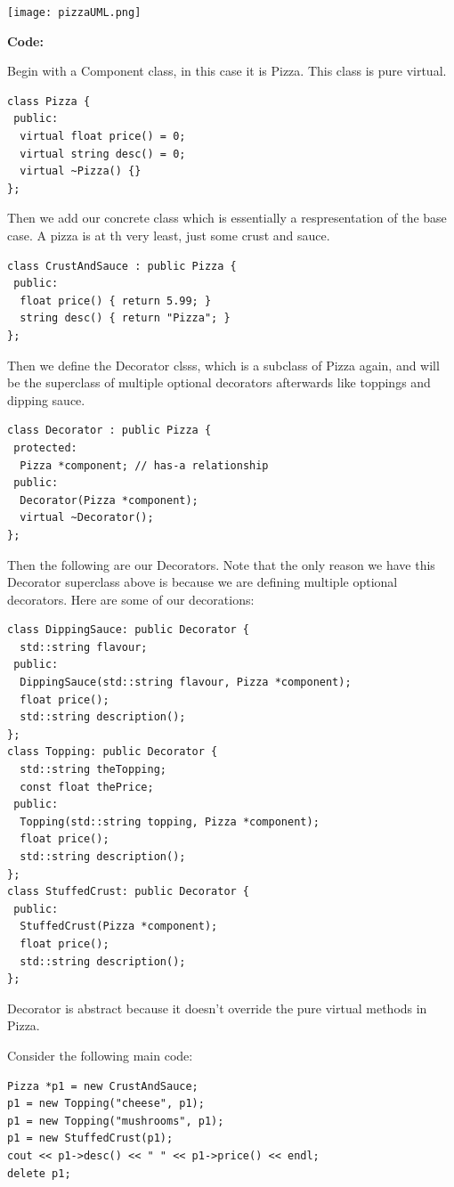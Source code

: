 \documentclass[english, 11pt]{article}
\begin{document}
\begin{exmp}
  \texttt{[image: pizzaUML.png]}

  \textbf{Code:}

Begin with a Component class, in this case it is Pizza. This class is pure virtual.
  \begin{lstlisting}
class Pizza {
 public:
  virtual float price() = 0;
  virtual string desc() = 0;
  virtual ~Pizza() {}
};
\end{lstlisting}
Then we add our concrete class which is essentially a respresentation of the base case. A pizza is at th very least, just some crust and sauce.
\begin{lstlisting}
class CrustAndSauce : public Pizza {
 public:
  float price() { return 5.99; }
  string desc() { return "Pizza"; }
};
\end{lstlisting}
Then we define the Decorator clsss, which is a subclass of Pizza again, and will be the superclass of multiple optional decorators afterwards like toppings and dipping sauce.
\begin{lstlisting}
class Decorator : public Pizza {
 protected:
  Pizza *component; // has-a relationship
 public:
  Decorator(Pizza *component);
  virtual ~Decorator();
};
\end{lstlisting}
Then the following are our Decorators. Note that the only reason we have this Decorator superclass above is because we are defining multiple optional decorators. Here are some of our decorations:
\begin{lstlisting}
class DippingSauce: public Decorator {
  std::string flavour;
 public:
  DippingSauce(std::string flavour, Pizza *component);
  float price();
  std::string description();
};
class Topping: public Decorator {
  std::string theTopping;
  const float thePrice;
 public:
  Topping(std::string topping, Pizza *component);
  float price();
  std::string description();
};
class StuffedCrust: public Decorator {
 public:
  StuffedCrust(Pizza *component);
  float price();
  std::string description();
};
  \end{lstlisting}
\begin{note}
    Decorator is abstract because it doesn't override the pure virtual methods in Pizza.
 \end{note}

Consider the following main code:
\begin{lstlisting}
Pizza *p1 = new CrustAndSauce;
p1 = new Topping("cheese", p1);
p1 = new Topping("mushrooms", p1);
p1 = new StuffedCrust(p1);
cout << p1->desc() << " " << p1->price() << endl;
delete p1;
\end{lstlisting}


\end{exmp}
\end{document}
